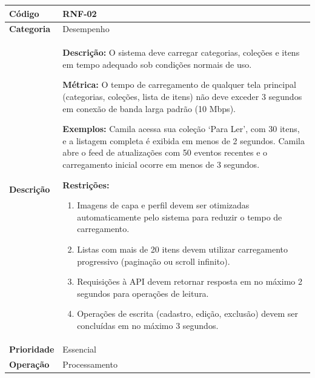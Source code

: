 \FloatBarrier
\begin{quadro}[h!]
\caption{RNF-02 -- Desempenho de Carregamento}
\label{quad:rnf02}
\begin{tabular}{|p{3.2cm}|p{11.8cm}|}
\hline
\textbf{Código}     & RNF-02 \\ \hline
\textbf{Categoria}  & Desempenho \\ \hline
\textbf{Descrição}  &
\textbf{Descrição:} O sistema deve carregar categorias, coleções e itens em tempo adequado sob condições normais de uso.

\textbf{Métrica:} O tempo de carregamento de qualquer tela principal (categorias, coleções, lista de itens) não deve exceder 3 segundos em conexão de banda larga padrão (10 Mbps).

\textbf{Exemplos:} Camila acessa sua coleção `Para Ler', com 30 itens, e a listagem completa é exibida em menos de 2 segundos.
Camila abre o feed de atualizações com 50 eventos recentes e o carregamento inicial ocorre em menos de 3 segundos.

\textbf{Restrições:}
\begin{enumerate}[nosep,leftmargin=1.2em,topsep=2pt,partopsep=0pt,parsep=0pt,itemsep=1pt]
  \item Imagens de capa e perfil devem ser otimizadas automaticamente pelo sistema para reduzir o tempo de carregamento.
  \item Listas com mais de 20 itens devem utilizar carregamento progressivo (paginação ou scroll infinito).
  \item Requisições à API devem retornar resposta em no máximo 2 segundos para operações de leitura.
  \item Operações de escrita (cadastro, edição, exclusão) devem ser concluídas em no máximo 3 segundos.
\end{enumerate} \\ \hline
\textbf{Prioridade} & Essencial \\ \hline
\textbf{Operação}   & Processamento \\ \hline
\end{tabular}
\end{quadro}

